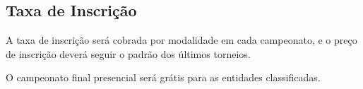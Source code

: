 \subsection{Taxa de Inscrição}

A taxa de inscrição será cobrada por modalidade em cada campeonato, e o preço de inscrição deverá seguir o padrão dos últimos torneios.

O campeonato final presencial será grátis para as entidades classificadas.